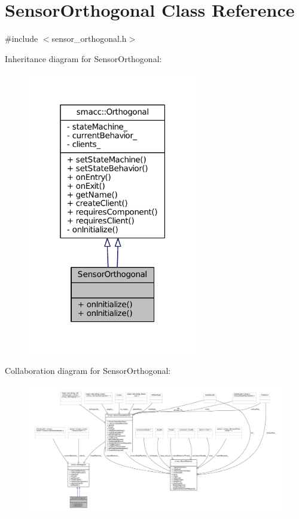 \hypertarget{classSensorOrthogonal}{}\section{Sensor\+Orthogonal Class Reference}
\label{classSensorOrthogonal}


{\ttfamily \#include $<$sensor\+\_\+orthogonal.\+h$>$}



Inheritance diagram for Sensor\+Orthogonal\+:
\nopagebreak
\begin{figure}[H]
\begin{center}
\leavevmode
\includegraphics[width=211pt]{classSensorOrthogonal__inherit__graph}
\end{center}
\end{figure}


Collaboration diagram for Sensor\+Orthogonal\+:
\nopagebreak
\begin{figure}[H]
\begin{center}
\leavevmode
\includegraphics[width=350pt]{classSensorOrthogonal__coll__graph}
\end{center}
\end{figure}
